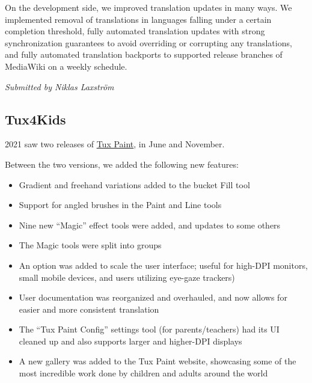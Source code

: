 \documentclass[a4paper]{report}
\begin{document}
On the development side, we improved translation updates in many ways. We implemented removal of translations in languages falling under a certain completion threshold, fully automated translation updates with strong synchronization guarantees to avoid overriding or corrupting any translations, and fully automated translation backports to supported release branches of MediaWiki on a weekly schedule.

{\em Submitted by Niklas Laxström}

\subsection{Tux4Kids}

2021 saw two releases of \href{https://tuxpaint.org/}{Tux Paint}, in June and November.

Between the two versions, we added the following new features:

\begin{itemize}

\item Gradient and freehand variations added to the bucket Fill tool

\item Support for angled brushes in the Paint and Line tools

\item Nine new ``Magic'' effect tools were added, and updates to some others

\item The Magic tools were split into groups

\item An option was added to scale the user interface; useful for high-DPI monitors, small mobile devices, and users utilizing eye-gaze trackers)

\item User documentation was reorganized and overhauled, and now allows for easier and more consistent translation

\item The ``Tux Paint Config'' settings tool (for parents/teachers) had its UI cleaned up and also supports larger and higher-DPI displays

\item A new gallery was added to the Tux Paint website, showcasing some of the most incredible work done by children and adults around the world

\end{itemize}
\end{document}
